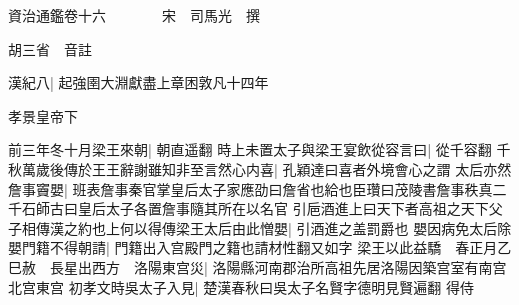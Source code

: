 資治通鑑卷十六　　　　宋　司馬光　撰

胡三省　音註

漢紀八|{
	起強圉大淵獻盡上章困敦凡十四年}


孝景皇帝下

前三年冬十月梁王來朝|{
	朝直遥翻}
時上未置太子與梁王宴飲從容言曰|{
	從千容翻}
千秋萬歲後傳於王王辭謝雖知非至言然心内喜|{
	孔穎達曰喜者外境會心之謂}
太后亦然詹事竇嬰|{
	班表詹事秦官掌皇后太子家應劭曰詹省也給也臣瓚曰茂陵書詹事秩真二千石師古曰皇后太子各置詹事隨其所在以名官}
引巵酒進上曰天下者高祖之天下父子相傳漢之約也上何以得傳梁王太后由此憎嬰|{
	引酒進之盖罰爵也}
嬰因病免太后除嬰門籍不得朝請|{
	門籍出入宫殿門之籍也請材性翻又如字}
梁王以此益驕　春正月乙巳赦　長星出西方　洛陽東宫災|{
	洛陽縣河南郡治所高祖先居洛陽因築宫室有南宫北宫東宫}
初孝文時吳太子入見|{
	楚漢春秋曰吳太子名賢字德明見賢遍翻}
得侍

